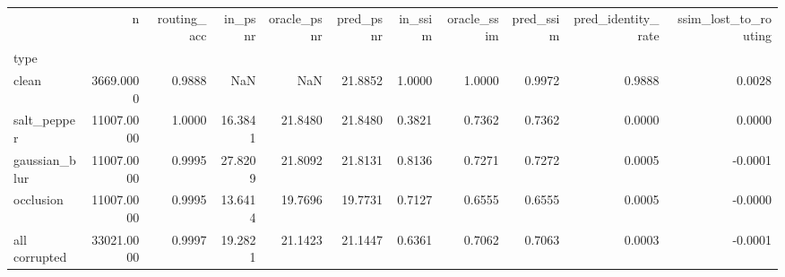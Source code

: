 \begin{tabular}{lrrrrrrrrrr}
\toprule
 & n & routing_acc & in_psnr & oracle_psnr & pred_psnr & in_ssim & oracle_ssim & pred_ssim & pred_identity_rate & ssim_lost_to_routing \\
type &  &  &  &  &  &  &  &  &  &  \\
\midrule
clean & 3669.0000 & 0.9888 & NaN & NaN & 21.8852 & 1.0000 & 1.0000 & 0.9972 & 0.9888 & 0.0028 \\
salt_pepper & 11007.0000 & 1.0000 & 16.3841 & 21.8480 & 21.8480 & 0.3821 & 0.7362 & 0.7362 & 0.0000 & 0.0000 \\
gaussian_blur & 11007.0000 & 0.9995 & 27.8209 & 21.8092 & 21.8131 & 0.8136 & 0.7271 & 0.7272 & 0.0005 & -0.0001 \\
occlusion & 11007.0000 & 0.9995 & 13.6414 & 19.7696 & 19.7731 & 0.7127 & 0.6555 & 0.6555 & 0.0005 & -0.0000 \\
all corrupted & 33021.0000 & 0.9997 & 19.2821 & 21.1423 & 21.1447 & 0.6361 & 0.7062 & 0.7063 & 0.0003 & -0.0001 \\
\bottomrule
\end{tabular}
